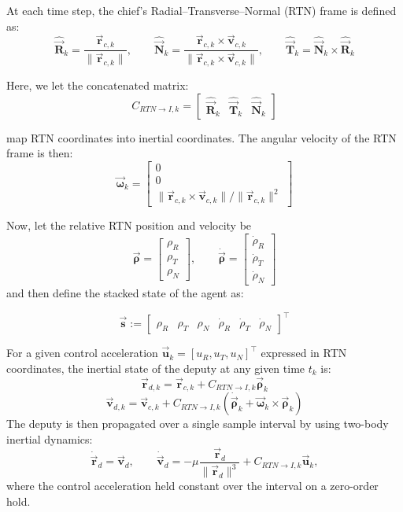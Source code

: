 At each time step, the chief's Radial--Transverse--Normal (RTN) frame is defined as:
\[
\hat{\vec{\mathbf{R}}}_k = \frac{\vec{\mathbf{r}}_{c,k}}{\|\vec{\mathbf{r}}_{c,k}\|},
\qquad
\hat{\vec{\mathbf{N}}}_k =
\frac{\vec{\mathbf{r}}_{c,k}\times \vec{\mathbf{v}}_{c,k}}
     {\|\vec{\mathbf{r}}_{c,k}\times \vec{\mathbf{v}}_{c,k}\|},
\qquad
\hat{\vec{\mathbf{T}}}_k = \hat{\vec{\mathbf{N}}}_k \times \hat{\vec{\mathbf{R}}}_k
\]

Here, we let the concatenated matrix:
\[
C_{RTN\to I,k}
=
\begin{bmatrix}
\hat{\vec{\mathbf{R}}}_k & \hat{\vec{\mathbf{T}}}_k & \hat{\vec{\mathbf{N}}}_k
\end{bmatrix}
\]

map RTN coordinates into inertial coordinates. The angular velocity of the RTN frame is then:
\[
\vec{\boldsymbol{\omega}}_k =
\begin{bmatrix}
0\\
0\\
\|\vec{\mathbf{r}}_{c,k}\times \vec{\mathbf{v}}_{c,k}\|/\|\vec{\mathbf{r}}_{c,k}\|^2
\end{bmatrix}
\]

Now, let the relative RTN position and velocity be
\[
\vec{\boldsymbol{\rho}} =
\begin{bmatrix}
\rho_R\\
\rho_T\\
\rho_N
\end{bmatrix},
\qquad
\dot{\vec{\boldsymbol{\rho}}} =
\begin{bmatrix}
\dot{\rho}_R\\
\dot{\rho}_T\\
\dot{\rho}_N
\end{bmatrix}
\]
and then define the stacked state of the agent as:

\[
\vec{\mathbf{s}} :=
\begin{bmatrix}
\rho_R &
\rho_T &
\rho_N &
\dot{\rho}_R &
\dot{\rho}_T &
\dot{\rho}_N
\end{bmatrix}^{\top}
\]

For a given control acceleration $
\vec{\mathbf{u}}_k = [u_R, u_T, u_N]^\top$ expressed in RTN coordinates, the inertial state of the deputy at any given time $t_k$ is:
\[
\vec{\mathbf{r}}_{d,k} = \vec{\mathbf{r}}_{c,k} + C_{RTN \to I,k}\vec{\boldsymbol{\rho}}_k
\]
\[
\vec{\mathbf{v}}_{d,k} = \vec{\mathbf{v}}_{c,k} + C_{RTN \to I,k}(\dot{\vec{\boldsymbol{\rho}}}_k + \vec{\boldsymbol{\omega}}_k \times \vec{\boldsymbol{\rho}}_k)
\]
The deputy is then propagated over a single sample interval by using two-body inertial dynamics:
\[
\dot{\vec{\mathbf{r}}}_d = \vec{\mathbf{v}}_d,
\qquad
\dot{\vec{\mathbf{v}}}_d = -\mu \frac{\vec{\mathbf{r}}_d}{ \|\vec{\mathbf{r}}_d\|^3} + C_{RTN \to I,k}\vec{\mathbf{u}}_k,
\]
where the control acceleration held constant over the interval on a zero-order hold.

